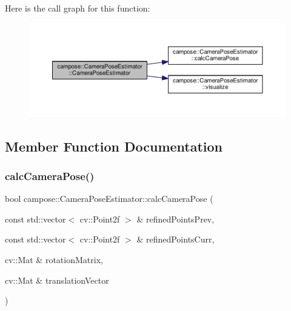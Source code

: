 Here is the call graph for this function\+:\nopagebreak
\begin{figure}[H]
\begin{center}
\leavevmode
\includegraphics[width=350pt]{classcampose_1_1CameraPoseEstimator_ac2e15d64ea58fbb2fe08b575a599a280_cgraph}
\end{center}
\end{figure}


\subsection{Member Function Documentation}
\mbox{\label{classcampose_1_1CameraPoseEstimator_a975c193e745e9150f0726e188a2daa1e}} 
\subsubsection{\texorpdfstring{calc\+Camera\+Pose()}{calcCameraPose()}}
{\footnotesize\ttfamily bool campose\+::\+Camera\+Pose\+Estimator\+::calc\+Camera\+Pose (\begin{DoxyParamCaption}\item[{const std\+::vector$<$ cv\+::\+Point2f $>$ \&}]{refined\+Points\+Prev,  }\item[{const std\+::vector$<$ cv\+::\+Point2f $>$ \&}]{refined\+Points\+Curr,  }\item[{cv\+::\+Mat \&}]{rotation\+Matrix,  }\item[{cv\+::\+Mat \&}]{translation\+Vector }\end{DoxyParamCaption})}


